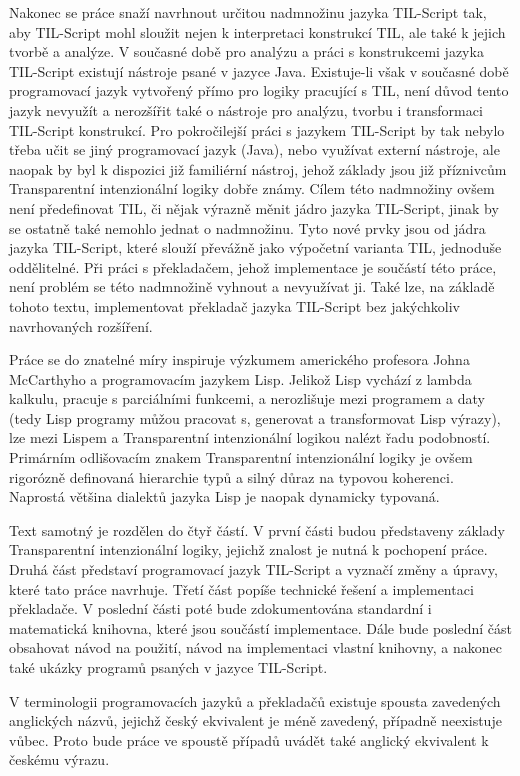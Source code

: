 Nakonec se práce snaží navrhnout určitou nadmnožinu jazyka TIL-Script tak, aby TIL-Script mohl
sloužit nejen k interpretaci konstrukcí TIL, ale také k jejich tvorbě a analýze. V současné době
pro analýzu a práci s konstrukcemi jazyka TIL-Script existují nástroje psané v jazyce Java.
Existuje-li však v současné době programovací jazyk vytvořený přímo pro logiky pracující s TIL,
není důvod tento jazyk nevyužít a nerozšířit také o nástroje pro analýzu, tvorbu i transformaci
TIL-Script konstrukcí. Pro pokročilejší práci s jazykem TIL-Script by tak nebylo třeba učit se jiný
programovací jazyk (Java), nebo využívat externí nástroje, ale naopak by byl k dispozici již
familiérní nástroj, jehož základy jsou již příznivcům Transparentní intenzionální logiky dobře
známy. Cílem této nadmnožiny ovšem není předefinovat TIL, či nějak výrazně měnit jádro jazyka
TIL-Script, jinak by se ostatně také nemohlo jednat o nadmnožinu. Tyto nové prvky jsou od jádra
jazyka TIL-Script, které slouží převážně jako výpočetní varianta TIL, jednoduše oddělitelné. Při
práci s překladačem, jehož implementace je součástí této práce, není problém se této nadmnožině
vyhnout a nevyužívat ji. Také lze, na základě tohoto textu, implementovat překladač jazyka
TIL-Script bez jakýchkoliv navrhovaných rozšíření.

Práce se do znatelné míry inspiruje výzkumem amerického profesora Johna McCarthyho a programovacím
jazykem Lisp\cite{lisp-src}. Jelikož Lisp vychází z lambda kalkulu, pracuje s parciálními funkcemi,
a nerozlišuje mezi programem a daty (tedy Lisp programy můžou pracovat s, generovat a transformovat
Lisp výrazy), lze mezi Lispem a Transparentní intenzionální logikou nalézt řadu podobností.
Primárním odlišovacím znakem Transparentní intenzionální logiky je ovšem rigorózně definovaná
hierarchie typů a silný důraz na typovou koherenci. Naprostá většina dialektů jazyka Lisp je naopak
dynamicky typovaná.

Text samotný je rozdělen do čtyř částí. V první části budou představeny základy Transparentní
intenzionální logiky, jejichž znalost je nutná k pochopení práce. Druhá část představí programovací
jazyk TIL-Script a vyznačí změny a úpravy, které tato práce navrhuje. Třetí část popíše technické
řešení a implementaci překladače. V poslední části poté bude zdokumentována standardní i
matematická knihovna, které jsou součástí implementace. Dále bude poslední část obsahovat návod
na použití, návod na implementaci vlastní knihovny, a nakonec také ukázky programů psaných v jazyce
TIL-Script.

V terminologii programovacích jazyků a překladačů existuje spousta zavedených anglických názvů,
jejichž český ekvivalent je méně zavedený, případně neexistuje vůbec. Proto bude práce ve spoustě
případů uvádět také anglický ekvivalent k českému výrazu.

\endinput
